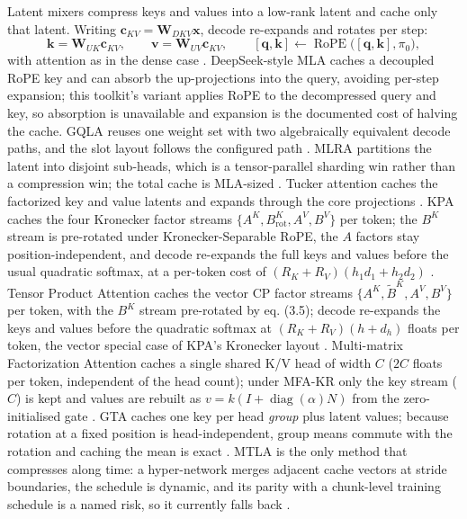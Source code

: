 Latent mixers compress keys and values into a low-rank latent and cache only that latent. Writing $\mathbf{c}_{KV} = \mathbf{W}_{DKV}\mathbf{x}$, decode re-expands and rotates per step:
\[
\mathbf{k} = \mathbf{W}_{UK}\mathbf{c}_{KV},\qquad
\mathbf{v} = \mathbf{W}_{UV}\mathbf{c}_{KV},\qquad
[\mathbf{q},\mathbf{k}] \leftarrow \operatorname{RoPE}\big([\mathbf{q},\mathbf{k}], \pi_0\big),
\]
with attention as in the dense case \citep{mehta_mla_2025}. DeepSeek-style MLA caches a decoupled RoPE key and can absorb the up-projections into the query, avoiding per-step expansion; this toolkit's variant applies RoPE to the decompressed query and key, so absorption is unavailable and expansion is the documented cost of halving the cache. GQLA reuses one weight set with two algebraically equivalent decode paths, and the slot layout follows the configured path \citep{meng_gqla_2026}. MLRA partitions the latent into disjoint sub-heads, which is a tensor-parallel sharding win rather than a compression win; the total cache is MLA-sized \citep{liu_mlra_2026}. Tucker attention caches the factorized key and value latents and expands through the core projections \citep{klein_tucker_2026}. KPA caches the four Kronecker factor streams $\{A^K, B^K_{\text{rot}}, A^V, B^V\}$ per token; the $B^K$ stream is pre-rotated under Kronecker-Separable RoPE, the $A$ factors stay position-independent, and decode re-expands the full keys and values before the usual quadratic softmax, at a per-token cost of $(R_K+R_V)(h_1d_1+h_2d_2)$ \citep{nikpour_kpa_2026}. Tensor Product Attention caches the vector CP factor streams $\{A^K, \widetilde{B}^K, A^V, B^V\}$ per token, with the $B^K$ stream pre-rotated by eq. (3.5); decode re-expands the keys and values before the quadratic softmax at $(R_K+R_V)(h+d_h)$ floats per token, the vector special case of KPA's Kronecker layout \citep{zhang_tpa_2025}. Multi-matrix Factorization Attention caches a single shared K/V head of width $C$ ($2C$ floats per token, independent of the head count); under MFA-KR only the key stream ($C$) is kept and values are rebuilt as $v=k(I+\operatorname{diag}(\alpha)N)$ from the zero-initialised gate \citep{hu_mfa_2025}. GTA caches one key per head \emph{group} plus latent values; because rotation at a fixed position is head-independent, group means commute with the rotation and caching the mean is exact \citep{sun_gta_2025}. MTLA is the only method that compresses along time: a hyper-network merges adjacent cache vectors at stride boundaries, the schedule is dynamic, and its parity with a chunk-level training schedule is a named risk, so it currently falls back \citep{deng_mtla_2025}.

